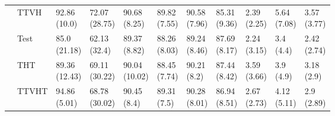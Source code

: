 \begin{table}
\begin{tabular}{lllllllllll}
       & TTVH &   \makecell{92.86\\(10.0)} &  \makecell{72.07\\(28.75)} &   \makecell{90.68\\(8.25)} &  \makecell{89.82\\(7.55)} &  \makecell{90.58\\(7.96)} &  \makecell{85.31\\(9.36)} &      \makecell{2.39\\(2.25)} &  \makecell{5.64\\(7.08)} &  \makecell{3.57\\(3.77)} \\
       & Test &   \makecell{85.0\\(21.18)} &   \makecell{62.13\\(32.4)} &   \makecell{89.37\\(8.82)} &  \makecell{88.26\\(8.03)} &  \makecell{89.24\\(8.46)} &  \makecell{87.69\\(8.17)} &      \makecell{2.24\\(3.15)} &    \makecell{3.4\\(4.4)} &  \makecell{2.42\\(2.74)} \\
       & THT &  \makecell{89.36\\(12.43)} &  \makecell{69.11\\(30.22)} &  \makecell{90.04\\(10.02)} &  \makecell{88.45\\(7.74)} &   \makecell{90.21\\(8.2)} &  \makecell{87.44\\(8.42)} &      \makecell{3.59\\(3.66)} &    \makecell{3.9\\(4.9)} &   \makecell{3.18\\(2.9)} \\
       & TTVHT &   \makecell{94.86\\(5.01)} &  \makecell{68.78\\(30.02)} &    \makecell{90.45\\(8.4)} &   \makecell{89.31\\(7.5)} &  \makecell{90.28\\(8.01)} &  \makecell{86.94\\(8.51)} &      \makecell{2.67\\(2.73)} &  \makecell{4.12\\(5.11)} &   \makecell{2.9\\(2.89)} \\
\bottomrule
\end{tabular}
\end{table}
